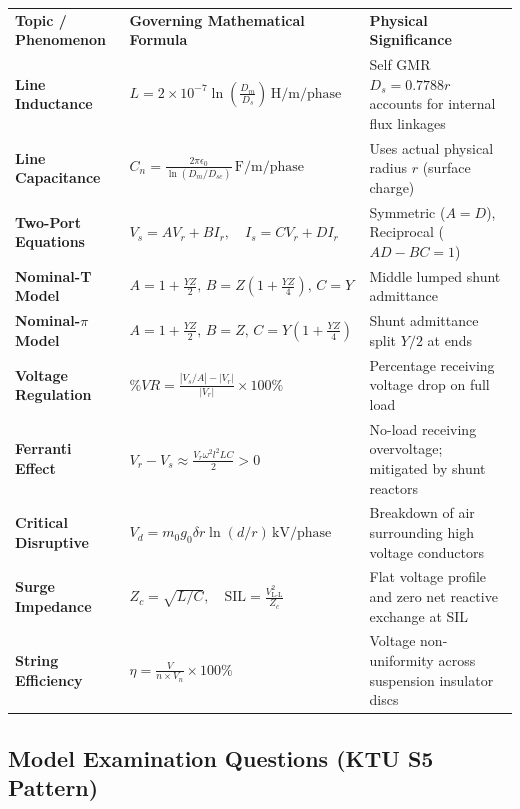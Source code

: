 \documentclass[11pt,a4paper]{article}
\begin{document}
\begin{center}
\small
\begin{tabularx}{\textwidth}{L{3.2cm} L{5.2cm} X}
  \color{white}\textbf{Topic / Phenomenon} & \color{white}\textbf{Governing Mathematical Formula} & \color{white}\textbf{Physical Significance} \\
   \textbf{Line Inductance} & $L = 2\times 10^{-7} \ln\left(\frac{D_m}{D_s}\right)\,\text{H/m/phase}$ & Self GMR $D_s = 0.7788r$ accounts for internal flux linkages \\
  \textbf{Line Capacitance} & $C_n = \frac{2\pi \epsilon_0}{\ln(D_m / D_{sc})}\,\text{F/m/phase}$ & Uses actual physical radius $r$ (surface charge) \\
   \textbf{Two-Port Equations} & $V_s = A V_r + B I_r, \quad I_s = C V_r + D I_r$ & Symmetric ($A=D$), Reciprocal ($AD-BC=1$) \\
  \textbf{Nominal-T Model} & $A = 1+\frac{YZ}{2}, \, B = Z(1+\frac{YZ}{4}), \, C=Y$ & Middle lumped shunt admittance \\
   \textbf{Nominal-$\pi$ Model} & $A = 1+\frac{YZ}{2}, \, B = Z, \, C=Y(1+\frac{YZ}{4})$ & Shunt admittance split $Y/2$ at ends \\
  \textbf{Voltage Regulation} & $\%VR = \frac{|V_s/A| - |V_r|}{|V_r|} \times 100\%$ & Percentage receiving voltage drop on full load \\
   \textbf{Ferranti Effect} & $V_r - V_s \approx \frac{V_r \omega^2 l^2 L C}{2} > 0$ & No-load receiving overvoltage; mitigated by shunt reactors \\
  \textbf{Critical Disruptive} & $V_d = m_0 g_0 \delta r \ln(d/r)\,\text{kV/phase}$ & Breakdown of air surrounding high voltage conductors \\
   \textbf{Surge Impedance} & $Z_c = \sqrt{L/C}, \quad \text{SIL} = \frac{V_{\text{L-L}}^2}{Z_c}$ & Flat voltage profile and zero net reactive exchange at SIL \\
  \textbf{String Efficiency} & $\eta = \frac{V}{n \times V_n} \times 100\%$ & Voltage non-uniformity across suspension insulator discs \\
\end{tabularx}
\end{center}

\subsection{Model Examination Questions (KTU S5 Pattern)}
\end{document}

